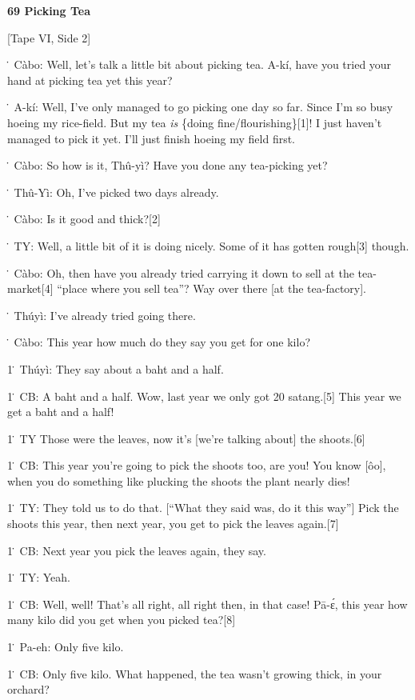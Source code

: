 
\textbf{69 Picking Tea}

[Tape VI, Side 2]

\. Càbo: Well, let's talk a little bit about picking tea.  A-kí, have you tried
your hand at picking tea yet this year?

\. A-kí: Well, I've only managed to go picking one day so far.  Since I'm so busy
hoeing my rice-field.  But my tea \textit{is} \{doing fine/flourishing\}[1]!  I
just haven't managed to pick it yet.  I'll just finish hoeing my field first.

\. Càbo: So how is it, Thû-yì? Have you done any tea-picking yet?

\. Thû-Yì: Oh, I've picked two days already.

\. Càbo: Is it good and thick?[2]

\. TY: Well, a little bit of it is doing nicely.  Some of it has gotten rough[3]
though.

\. Càbo: Oh, then have you already tried carrying it down to sell at the tea-market[4]
``place where you sell tea''?  Way over there [at the tea-factory].

\. Thúyì: I've already tried going there.

\. Càbo: This year how much do they say you get for one kilo?

1\. Thúyì: They say about a baht and a half.

1\. CB: A baht and a half.  Wow, last year we only got 20 satang.[5]  This year
we get a baht and a half!

1\. TY Those were the leaves, now it's [we're talking about] the shoots.[6]

1\. CB: This year you're going to pick the shoots too, are you!  You know [ôo],
when you do something like plucking the shoots the plant nearly dies!

1\. TY: They told us to do that.  [``What they said was, do it this way'']  Pick
the shoots this year, then next year, you get to pick the leaves again.[7]

1\. CB: Next year you pick the leaves again, they say.

1\. TY: Yeah.

1\. CB: Well, well!  That's all right, all right then, in that case!  Pā-ɛ́,
this year how many kilo did you get when you picked tea?[8]

1\. Pa-eh: Only five kilo.

1\. CB: Only five kilo.  What happened, the tea wasn't growing thick, in your orchard?

